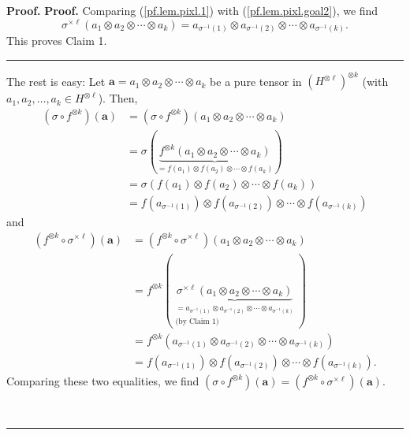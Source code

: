 \documentclass[numbers=enddot,12pt,final,onecolumn,notitlepage]{scrartcl}%
\theoremstyle{definition}
\newenvironment{proof}[1][Proof]{\noindent\textbf{#1.} }{\ \rule{0.5em}{0.5em}}
\begin{document}
\begin{proof}
\begin{proof}
Comparing (\ref{pf.lem.pixl.1}) with (\ref{pf.lem.pixl.goal2}), we find%
\[
\sigma^{\times\ell}\left(  a_{1}\otimes a_{2}\otimes\cdots\otimes
a_{k}\right)  =a_{\sigma^{-1}\left(  1\right)  }\otimes a_{\sigma^{-1}\left(
2\right)  }\otimes\cdots\otimes a_{\sigma^{-1}\left(  k\right)  }.
\]
This proves Claim 1.
\end{proof}

The rest is easy: Let $\mathbf{a}=a_{1}\otimes a_{2}\otimes\cdots\otimes
a_{k}$ be a pure tensor in $\left(  H^{\otimes\ell}\right)  ^{\otimes k}$
(with $a_{1},a_{2},\ldots,a_{k}\in H^{\otimes\ell}$). Then,%
\begin{align*}
\left(  \sigma\circ f^{\otimes k}\right)  \left(  \mathbf{a}\right)   &
=\left(  \sigma\circ f^{\otimes k}\right)  \left(  a_{1}\otimes a_{2}%
\otimes\cdots\otimes a_{k}\right) \\
&  =\sigma\left(  \underbrace{f^{\otimes k}\left(  a_{1}\otimes a_{2}%
\otimes\cdots\otimes a_{k}\right)  }_{=f\left(  a_{1}\right)  \otimes f\left(
a_{2}\right)  \otimes\cdots\otimes f\left(  a_{k}\right)  }\right) \\
&  =\sigma\left(  f\left(  a_{1}\right)  \otimes f\left(  a_{2}\right)
\otimes\cdots\otimes f\left(  a_{k}\right)  \right) \\
&  =f\left(  a_{\sigma^{-1}\left(  1\right)  }\right)  \otimes f\left(
a_{\sigma^{-1}\left(  2\right)  }\right)  \otimes\cdots\otimes f\left(
a_{\sigma^{-1}\left(  k\right)  }\right)
\end{align*}
and%
\begin{align*}
\left(  f^{\otimes k}\circ\sigma^{\times\ell}\right)  \left(  \mathbf{a}%
\right)   &  =\left(  f^{\otimes k}\circ\sigma^{\times\ell}\right)  \left(
a_{1}\otimes a_{2}\otimes\cdots\otimes a_{k}\right) \\
&  =f^{\otimes k}\left(  \underbrace{\sigma^{\times\ell}\left(  a_{1}\otimes
a_{2}\otimes\cdots\otimes a_{k}\right)  }_{\substack{=a_{\sigma^{-1}\left(
1\right)  }\otimes a_{\sigma^{-1}\left(  2\right)  }\otimes\cdots\otimes
a_{\sigma^{-1}\left(  k\right)  }\\\text{(by Claim 1)}}}\right) \\
&  =f^{\otimes k}\left(  a_{\sigma^{-1}\left(  1\right)  }\otimes
a_{\sigma^{-1}\left(  2\right)  }\otimes\cdots\otimes a_{\sigma^{-1}\left(
k\right)  }\right) \\
&  =f\left(  a_{\sigma^{-1}\left(  1\right)  }\right)  \otimes f\left(
a_{\sigma^{-1}\left(  2\right)  }\right)  \otimes\cdots\otimes f\left(
a_{\sigma^{-1}\left(  k\right)  }\right)  .
\end{align*}
Comparing these two equalities, we find $\left(  \sigma\circ f^{\otimes
k}\right)  \left(  \mathbf{a}\right)  =\left(  f^{\otimes k}\circ
\sigma^{\times\ell}\right)  \left(  \mathbf{a}\right)  $.


\end{proof}
\end{document}
